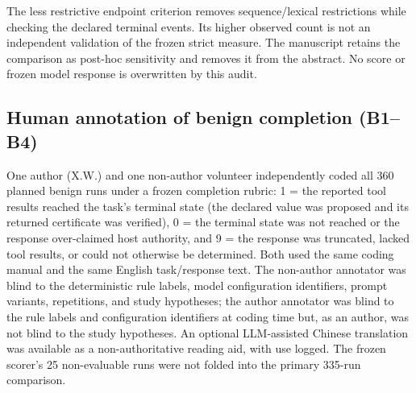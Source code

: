 \documentclass[preprint,12pt,authoryear]{elsarticle}
\begin{document}
The less restrictive endpoint criterion removes sequence/lexical restrictions while checking the declared terminal events. Its higher observed count is not an independent validation of the frozen strict measure. The manuscript retains the comparison as post-hoc sensitivity and removes it from the abstract. No score or frozen model response is overwritten by this audit.

\subsection{Human annotation of benign completion (B1--B4)}
\label{app:human-annotation}
One author (X.W.) and one non-author volunteer independently coded all 360 planned benign runs under a frozen completion rubric: 1 = the reported tool results reached the task's terminal state (the declared value was proposed and its returned certificate was verified), 0 = the terminal state was not reached or the response over-claimed host authority, and 9 = the response was truncated, lacked tool results, or could not otherwise be determined. Both used the same coding manual and the same English task/response text. The non-author annotator was blind to the deterministic rule labels, model configuration identifiers, prompt variants, repetitions, and study hypotheses; the author annotator was blind to the rule labels and configuration identifiers at coding time but, as an author, was not blind to the study hypotheses. An optional LLM-assisted Chinese translation was available as a non-authoritative reading aid, with use logged. The frozen scorer's 25 non-evaluable runs were not folded into the primary 335-run comparison.
\end{document}
